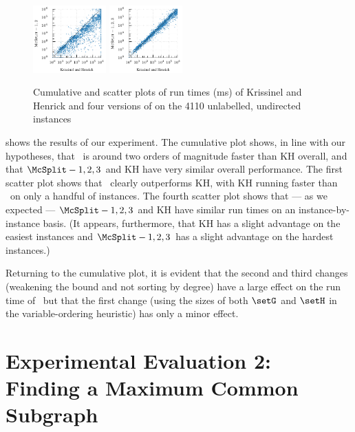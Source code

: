 \begin{figure}[htb]
{        \includegraphics*[width=0.25\textwidth]{14-mcsplit-i-undirected/krissinel/mcs-instances-experiment/plots/kh-vs-mcsplit-2}
        \includegraphics*[width=0.25\textwidth]{14-mcsplit-i-undirected/krissinel/mcs-instances-experiment/plots/kh-vs-mcsplit-3}
        \label{figure:kh-plain-cumulative}
    }
    \caption{Cumulative and scatter plots of run times (ms) of Krissinel and Henrick \cite{DBLP:journals/spe/KrissinelH04}
            and four versions of \McSplit on the 4110 unlabelled, undirected instances}\label{fig:mcsplit-vs-kh}
\end{figure}

 shows the results of our experiment.  The cumulative plot shows,
in line with our hypotheses,
that \McSplit\ is around two orders of magnitude faster than KH overall, and that
$\McSplit - 1,2,3$ and KH have very similar overall performance.  The first scatter
plot shows that \McSplit\ clearly outperforms KH, with KH running faster than \McSplit\
on only a handful of instances.  The fourth scatter plot shows that --- as we expected ---
$\McSplit - 1,2,3$ and KH have similar run times on an instance-by-instance basis.
(It appears, furthermore, that
KH has a slight advantage on the easiest instances and
$\McSplit - 1,2,3$ has a slight advantage on the hardest instances.)

Returning to the cumulative plot, it is evident that the second and third changes (weakening
the bound and not sorting by degree) have a large effect on the run time of \McSplit\,
but that the first change (using the sizes of both $\setG$ and $\setH$ in the variable-ordering
heuristic) has only a minor effect.

\FloatBarrier

\section{Experimental Evaluation 2: Finding a Maximum Common Subgraph}
\label{sec:mcsplit-experiments}

